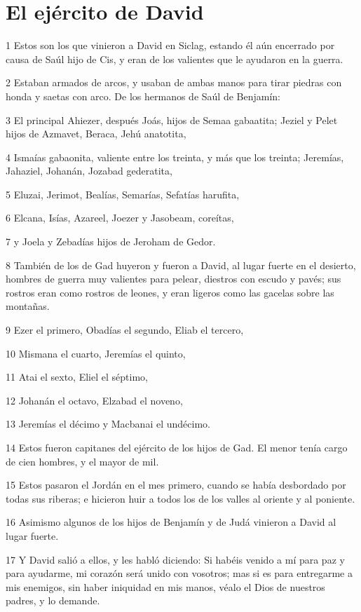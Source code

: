 \section*{El ejército de David}

\par 1 Estos son los que vinieron a David en Siclag, estando él aún encerrado por causa de Saúl hijo de Cis, y eran de los valientes que le ayudaron en la guerra.
\par 2 Estaban armados de arcos, y usaban de ambas manos para tirar piedras con honda y saetas con arco. De los hermanos de Saúl de Benjamín:
\par 3 El principal Ahiezer, después Joás, hijos de Semaa gabaatita; Jeziel y Pelet hijos de Azmavet, Beraca, Jehú anatotita,
\par 4 Ismaías gabaonita, valiente entre los treinta, y más que los treinta; Jeremías, Jahaziel, Johanán, Jozabad gederatita,
\par 5 Eluzai, Jerimot, Bealías, Semarías, Sefatías harufita,
\par 6 Elcana, Isías, Azareel, Joezer y Jasobeam, coreítas,
\par 7 y Joela y Zebadías hijos de Jeroham de Gedor.
\par 8 También de los de Gad huyeron y fueron a David, al lugar fuerte en el desierto, hombres de guerra muy valientes para pelear, diestros con escudo y pavés; sus rostros eran como rostros de leones, y eran ligeros como las gacelas sobre las montañas.
\par 9 Ezer el primero, Obadías el segundo, Eliab el tercero,
\par 10 Mismana el cuarto, Jeremías el quinto,
\par 11 Atai el sexto, Eliel el séptimo,
\par 12 Johanán el octavo, Elzabad el noveno,
\par 13 Jeremías el décimo y Macbanai el undécimo.
\par 14 Estos fueron capitanes del ejército de los hijos de Gad. El menor tenía cargo de cien hombres, y el mayor de mil.
\par 15 Estos pasaron el Jordán en el mes primero, cuando se había desbordado por todas sus riberas; e hicieron huir a todos los de los valles al oriente y al poniente.
\par 16 Asimismo algunos de los hijos de Benjamín y de Judá vinieron a David al lugar fuerte.
\par 17 Y David salió a ellos, y les habló diciendo: Si habéis venido a mí para paz y para ayudarme, mi corazón será unido con vosotros; mas si es para entregarme a mis enemigos, sin haber iniquidad en mis manos, véalo el Dios de nuestros padres, y lo demande.
